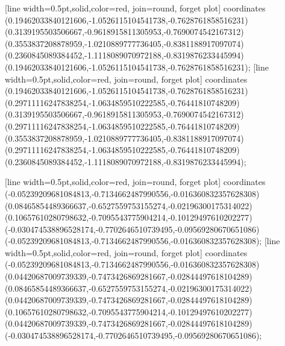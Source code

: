 [line width=0.5pt,solid,color=red, join=round, forget plot] coordinates {(0.19462033840121606,-1.0526115104541738,-0.7628761858516231) (0.3139195503506667,-0.9618915811305953,-0.7690074542167312) (0.3553837208878959,-1.0210889777736405,-0.8381188917097074) (0.2360845089384452,-1.1118089070972188,-0.8319876233445994) (0.19462033840121606,-1.0526115104541738,-0.7628761858516231)};
[line width=0.5pt,solid,color=red, join=round, forget plot] coordinates {(0.19462033840121606,-1.0526115104541738,-0.7628761858516231) (0.29711116247838254,-1.0634859510222585,-0.76441810748209) (0.3139195503506667,-0.9618915811305953,-0.7690074542167312) (0.29711116247838254,-1.0634859510222585,-0.76441810748209) (0.3553837208878959,-1.0210889777736405,-0.8381188917097074) (0.29711116247838254,-1.0634859510222585,-0.76441810748209) (0.2360845089384452,-1.1118089070972188,-0.8319876233445994)};

[line width=0.5pt,solid,color=red, join=round, forget plot] coordinates {(-0.05239209681084813,-0.7134662487990556,-0.016360832357628308) (0.08465854489366637,-0.6527559753155274,-0.02196300175314022) (0.10657610280798632,-0.7095543775904214,-0.10129497610202277) (-0.030474538896528174,-0.7702646510739495,-0.09569280670651086) (-0.05239209681084813,-0.7134662487990556,-0.016360832357628308)};
[line width=0.5pt,solid,color=red, join=round, forget plot] coordinates {(-0.05239209681084813,-0.7134662487990556,-0.016360832357628308) (0.04420687009739339,-0.7473426869281667,-0.02844497618104289) (0.08465854489366637,-0.6527559753155274,-0.02196300175314022) (0.04420687009739339,-0.7473426869281667,-0.02844497618104289) (0.10657610280798632,-0.7095543775904214,-0.10129497610202277) (0.04420687009739339,-0.7473426869281667,-0.02844497618104289) (-0.030474538896528174,-0.7702646510739495,-0.09569280670651086)};

